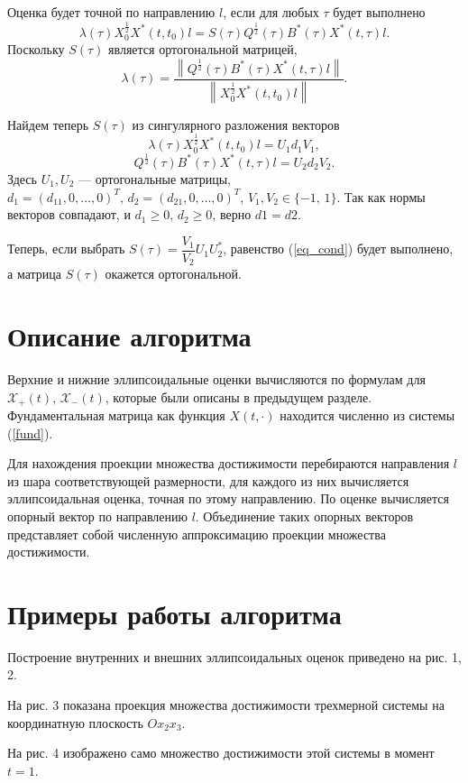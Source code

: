 \documentclass[16pt]{article}
\newcommand\Norm[1]{\left\| #1 \right\|}
\begin{document}
Оценка будет точной по направлению $l$, если для любых $\tau$ будет выполнено
\begin{equation}\label{eq_cond}
\lambda(\tau)X_0^\frac12X^*(t, t_0)l = S(\tau)Q^{\frac12}(\tau)B^*(\tau)X^*(t, \tau)l.
\end{equation}
Поскольку $S(\tau)$ является ортогональной матрицей, 
$$\lambda(\tau) = \dfrac{\Norm{Q^{\frac12}(\tau)B^*(\tau)X^*(t, \tau)l}}{\Norm{X_0^\frac12X^*(t, t_0)l}}.$$

Найдем теперь $S(\tau)$ из сингулярного разложения векторов
$$\lambda(\tau)X_0^\frac12X^*(t, t_0)l = U_1d_1V_1,$$
$$Q^{\frac12}(\tau)B^*(\tau)X^*(t, \tau)l = U_2d_2V_2.$$
Здесь $U_1, U_2$ --- ортогональные матрицы, $d_1 = (d_{11}, 0, \ldots, 0)^T,\, d_2 = (d_{21}, 0, \ldots, 0)^T$,
$V_1, V_2 \in \{-1,\, 1\}$. Так как нормы векторов совпадают, и $d_1 \geq 0, \, d_2 \geq 0$, верно $d1 = d2$.

Теперь, если выбрать $S(\tau) = \dfrac{V_1}{V_2}U_1U_2^*$, равенство (\ref{eq_cond}) будет выполнено, а матрица $S(\tau)$ окажется ортогональной.

\section{Описание алгоритма}

Верхние и нижние эллипсоидальные оценки вычисляются по формулам для $\mathcal{X}_+(t),\, \mathcal{X}_-(t)$,
которые были описаны в предыдущем разделе. Фундаментальная матрица как функция $X(t, \cdot)$ находится численно из системы (\ref{fund}).

Для нахождения проекции множества достижимости перебираются направления $l$ из шара соответствующей размерности, для каждого из них вычисляется эллипсоидальная оценка, точная по этому направлению. По оценке вычисляется опорный вектор по направлению $l$. Объединение таких опорных векторов представляет собой численную аппроксимацию проекции множества достижимости.

\section{Примеры работы алгоритма}

Построение внутренних и внешних эллипсоидальных оценок приведено на рис. 1, 2. 

На рис. 3 показана проекция множества достижимости трехмерной системы на координатную плоскость $Ox_2x_3$.

На рис. 4 изображено само множество достижимости этой системы в момент $t = 1$.
\end{document}
